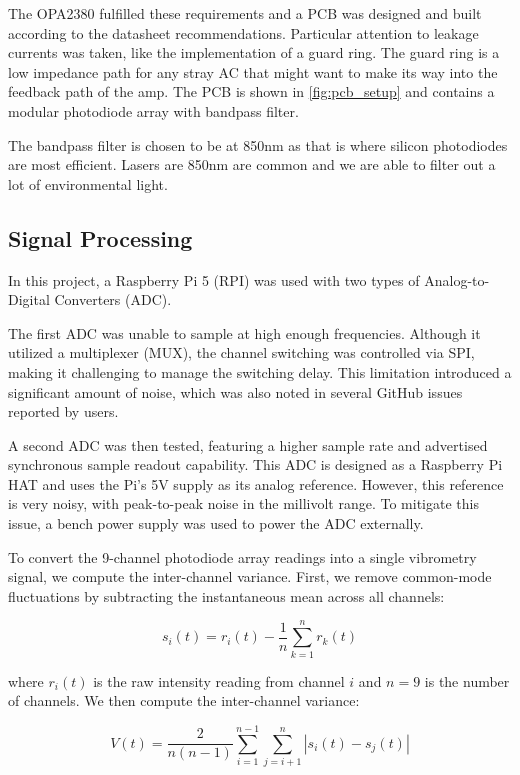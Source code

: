 The OPA2380 fulfilled these requirements and a PCB was designed and built according to the datasheet recommendations. Particular attention to leakage currents was taken, like the implementation of a guard ring. The guard ring is a low impedance path for any stray AC that might want to make its way into the feedback path of the amp. The PCB is shown in \ref{fig:pcb_setup} and contains a modular photodiode array with bandpass filter.

The bandpass filter is chosen to be at 850nm as that is where silicon photodiodes are most efficient. Lasers are 850nm are common and we are able to filter out a lot of environmental light.


\subsection{Signal Processing}

In this project, a Raspberry Pi 5 (RPI) was used with two types of Analog-to-Digital Converters (ADC).

The first ADC was unable to sample at high enough frequencies. Although it utilized a multiplexer (MUX), the channel switching was controlled via SPI, making it challenging to manage the switching delay. This limitation introduced a significant amount of noise, which was also noted in several GitHub issues reported by users.

A second ADC was then tested, featuring a higher sample rate and advertised synchronous sample readout capability. This ADC is designed as a Raspberry Pi HAT and uses the Pi's 5V supply as its analog reference. However, this reference is very noisy, with peak-to-peak noise in the millivolt range. To mitigate this issue, a bench power supply was used to power the ADC externally.

To convert the 9-channel photodiode array readings into a single vibrometry signal, we compute the inter-channel variance. 
First, we remove common-mode fluctuations by subtracting the instantaneous mean across all channels:

\begin{equation}
s_i(t) = r_i(t) - \frac{1}{n}\sum_{k=1}^{n} r_k(t)
\end{equation}

where $r_i(t)$ is the raw intensity reading from channel $i$ and $n=9$ is the number of channels. We then compute the inter-channel variance:

\begin{equation}
V(t) = \frac{2}{n(n-1)} \sum_{i=1}^{n-1} \sum_{j=i+1}^{n} |s_i(t) - s_j(t)|
\end{equation}


